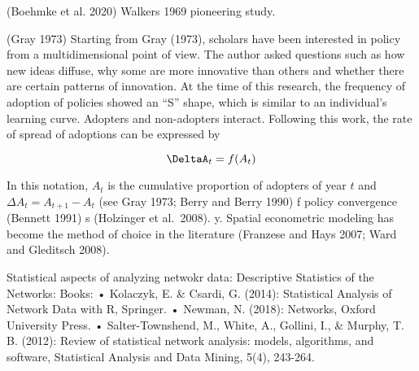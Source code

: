 \documentclass[
  letterpaper,
  DIV=11,
  numbers=noendperiod]{scrartcl}
\begin{document}
(Boehmke et al. 2020) Walkers 1969 pioneering study.

(Gray 1973) Starting from Gray (1973), scholars have been interested in
policy from a multidimensional point of view. The author asked questions
such as how new ideas diffuse, why some are more innovative than others
and whether there are certain patterns of innovation. At the time of
this research, the frequency of adoption of policies showed an ``S''
shape, which is similar to an individual's learning curve. Adopters and
non-adopters interact. Following this work, the rate of spread of
adoptions can be expressed by

\[
\DeltaA_t = f(A_t)
\]

In this notation, \(A_t\) is the cumulative proportion of adopters of
year \(t\) and \(\Delta A_t = A_{t+1} - A_t\) (see Gray 1973; Berry and
Berry 1990) f policy convergence (Bennett 1991) s (Holzinger et
al.~2008). y. Spatial econometric modeling has become the method of
choice in the literature (Franzese and Hays 2007; Ward and Gleditsch
2008).

Statistical aspects of analyzing netwokr data: Descriptive Statistics of
the Networks: Books: • Kolaczyk, E. \& Csardi, G. (2014): Statistical
Analysis of Network Data with R, Springer. • Newman, N. (2018):
Networks, Oxford University Press. • Salter-Townshend, M., White, A.,
Gollini, I., \& Murphy, T. B. (2012): Review of statistical network
analysis: models, algorithms, and software, Statistical Analysis and
Data Mining, 5(4), 243-264.
\end{document}

